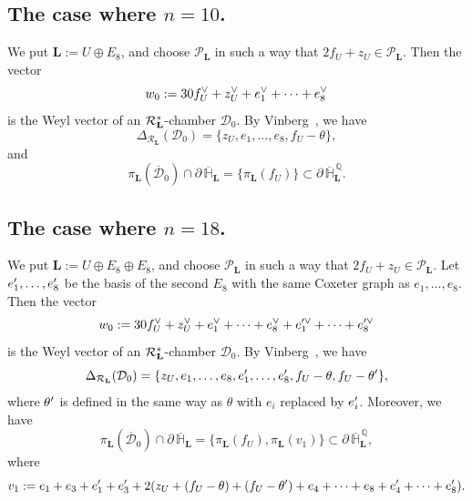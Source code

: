 \documentclass{amsart}
\theoremstyle{plain}
\theoremstyle{definition}
\theoremstyle{remark}
\numberwithin{equation}{section}
\numberwithin{table}{section}
\numberwithin{figure}{section}
\renewcommand{\H}{\mathord{\mathbb H}}
\newcommand{\Q}{\mathord{\mathbb  Q}}
\newcommand{\DDD}{\mathord{\mathcal D}}
\newcommand{\PPP}{\mathord{\mathcal P}}
\newcommand{\RRR}{\mathord{\mathcal R}}
\newcommand{\sprime}{\sp\prime}
\newcommand{\dual}{\sp{\vee}}
\newcommand{\bdr}{\partial\,}
\renewcommand{\L}{\mathord{\mathbf{L}}}
\newcommand{\Roots}{\RRR}
\newcommand{\sphyp}{\sp*}
\newcommand{\clH}{\overline{\H}}
\newcommand{\clDDD}{\overline{\DDD}}
\newcommand{\bdrclH}{\bdr\clH}
\newcommand{\bdrclHQ}{\bdr\clH^{\,\Q}}
\begin{document}
\subsection{The case where $n=10$.}\label{subsec:10}
%
We put
$\L:=U\oplus E_8$,
and choose $\PPP_{\L}$ in such a way that
$2f_U+z_U\in \PPP_{\L}$.
Then the vector
$$
w_0:=30 f_U\dual +z_U\dual +e_1\dual+ \cdots+ e_8\dual
$$
 is the Weyl vector of an $\Roots_{\L}\sphyp$-chamber $\DDD_0$.
 By Vinberg~\cite{MR0422505}, 
we have 
$$
\Delta_{\Roots_{\L}}(\DDD_0)=\{z_U, e_1, \dots, e_8, f_U-\theta\},
$$
and
$$
\pi_{\L}(\clDDD_0)\cap \bdrclH_{\L}=\{\pi_{\L}(f_U)\}\subset \bdrclHQ_{\L}.
$$
%
%
\subsection{The case where  $n=18$.}\label{subsec:18}
We put 
$\L:=
U\oplus E_8\oplus E_8$,
and choose $\PPP_{\L}$ in such a way that
$2f_U+z_U\in \PPP_{\L}$.
Let $e_1\sprime, \dots, e_8\sprime$ be the basis of the second $ E_8$
with the same Coxeter graph as  $e_1, \dots, e_8$.
Then the vector
$$
w_0:=
30 f\dual_U +z\dual_U +e_1\dual+ \cdots+ e_8\dual+e_1^{\prime\vee}+\cdots+ e_8^{\prime\vee}
$$
is the Weyl vector of an $\Roots_{\L}\sphyp$-chamber $\DDD_0$.
 By Vinberg~\cite{MR0422505}, 
 we have 
$$
\Delta_{\Roots_{\L}}(\DDD_0)=
\{z_U, e_1, \dots, e_8, e_1\sprime, \dots, e_8\sprime, f_U-\theta, f_U-\theta\sprime\},
$$
where  $\theta\sprime$ is 
defined in the same way as $\theta$ with $e_i$ replaced by $e_i\sprime$.
Moreover, we have
$$
\pi_{\L}(\clDDD_0)\cap \bdrclH_{\L}=\{\pi_{\L}(f_U), \pi_{\L}(v_1) \}\subset \bdrclHQ_{\L},
$$
where
$$
v_1:=e_1+e_3+e_1\sprime+e_3\sprime+
2 (z_U+(f_U-\theta)+(f_U-\theta\sprime)+e_4+\cdots+e_8+e_4\sprime+\cdots+e_8\sprime).
$$
%
%
\end{document}
